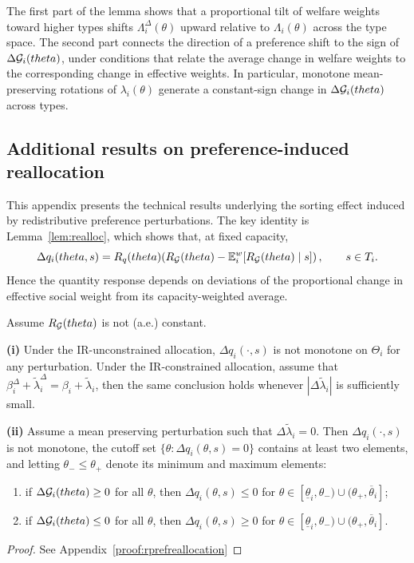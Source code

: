 \documentclass{class}
\begin{document}
The first part of the lemma shows that a proportional tilt of welfare weights toward higher types shifts $\Lambda_i^\Delta(\theta)$ upward relative to $\Lambda_i(\theta)$ across the type space. The second part connects the direction of a preference shift to the sign of $\Delta\mathcal{G}_i(theta)$, under conditions that relate the average change in welfare weights to the corresponding change in effective weights. In particular, monotone mean-preserving rotations of $\lambda_i(\theta)$ generate a constant-sign change in $\Delta\mathcal{G}_i(theta)$ across types.
\subsection{Additional results on preference-induced reallocation}\label{app:pref-reallocation}

This appendix presents the technical results underlying the sorting effect induced by redistributive preference perturbations. The key identity is Lemma~\ref{lem:realloc}, which shows that, at fixed capacity,
\[
\Delta q_i(theta,s) = R_q(theta)\!\left(R_{\mathcal{G}}(theta)-\mathbb{E} _i^w\!\left[R_{\mathcal{G}}(theta)\mid s\right]\right), \qquad s\in T_i.
\]
Hence the quantity response depends on deviations of the proportional change in effective social weight from its capacity-weighted average. 

\begin{proposition}\label{prop:rprefreallocation}
Assume $R_{\mathcal{G}}(theta)$ is not (a.e.) constant.

\noindent\textbf{(i)} Under the IR-unconstrained allocation, $\Delta q_i(\cdot,s)$ is not monotone on $\Theta_i$ for any perturbation. Under the IR-constrained allocation, assume that $\beta_i^\Delta+\tilde\lambda_i^\Delta=\beta_i+\tilde\lambda_i$, then the same conclusion holds whenever $|\Delta\tilde\lambda_i|$ is sufficiently small.

\noindent\textbf{(ii)} Assume a mean preserving perturbation such that $\Delta\tilde\lambda_i=0$. Then $\Delta q_i(\cdot,s)$ is not monotone, the cutoff set $\{\theta:\Delta q_i(\theta,s)=0\}$ contains at least two elements, and letting $\theta_-\le\theta_+$ denote its minimum and maximum elements:
\begin{enumerate}[label=(\roman*), leftmargin=1cm]
\item if $\Delta\mathcal{G}_i(theta)\ge 0$ for all $\theta$, then $\Delta q_i(\theta,s)\le 0$ for $\theta\in[\underline\theta_i,\theta_-)\cup(\theta_+,\overline\theta_i]$;
\item if $\Delta\mathcal{G}_i(theta)\le 0$ for all $\theta$, then $\Delta q_i(\theta,s)\ge 0$ for $\theta\in[\underline\theta_i,\theta_-)\cup(\theta_+,\overline\theta_i]$.
\end{enumerate}
\end{proposition}
\begin{proof}
    See Appendix~\ref{proof:rprefreallocation}
\end{proof}
\end{document}
